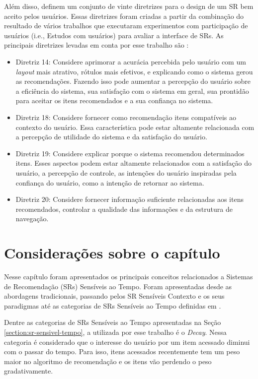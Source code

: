 Além disso,  definem um conjunto de vinte diretrizes para o design de um SR bem aceito
pelos usuários. Essas diretrizes foram criadas a partir da combinação do resultado de vários trabalhos que executaram
experimentos com participação de usuários (i.e., Estudos com usuários) para avaliar a interface de SRs. As principais
diretrizes levadas em conta por esse trabalho são \cite{pu2012evaluating}:

\begin{itemize}
\item Diretriz 14: Considere aprimorar a acurácia percebida pelo usuário com um \textit{layout} mais atrativo, rótulos mais
efetivos, e explicando como o sistema gerou as recomendações. Fazendo isso pode aumentar a percepção do usuário sobre a
eficiência do sistema, sua satisfação com o sistema em geral, sua prontidão para aceitar os itens recomendados e a sua
confiança no sistema.
\item Diretriz 18: Considere fornecer como recomendação itens compatíveis ao contexto do usuário. Essa característica
pode estar altamente relacionada com a percepção de utilidade do sistema e da satisfação do usuário.
\item Diretriz 19: Considere explicar porque o sistema recomendou determinados itens. Esses aspectos podem estar
altamente relacionados com a satisfação do usuário, a percepção de controle, as intenções do usuário inspiradas pela
confiança do usuário, como a intenção de retornar ao sistema.
\item Diretriz 20: Considere fornecer informação suficiente relacionadas aos itens recomendados, controlar a qualidade
das informações e da estrutura de navegação.
\end{itemize}

\section{Considerações sobre o capítulo}

Nesse capítulo foram apresentados os principais conceitos relacionados a Sistemas de Recomendação (SRs) Sensíveis ao Tempo.
Foram apresentadas desde as abordagens tradicionais, passando pelos SR Sensíveis Contexto e os seus paradigmas até as
categorias de SRs Sensíveis ao Tempo definidas em .

Dentre as categorias de SRs Sensíveis ao Tempo apresentadas na Seção \ref{section:sr-sensivel-tempo}, a utilizada por esse
trabalho é o \textit{Decay}. Nessa categoria é considerado que o interesse do usuário por um item acessado diminui com o passar
do tempo. Para isso, itens acessados recentemente tem um peso maior no algoritmo de recomendação e os itens vão perdendo
o peso gradativamente.

